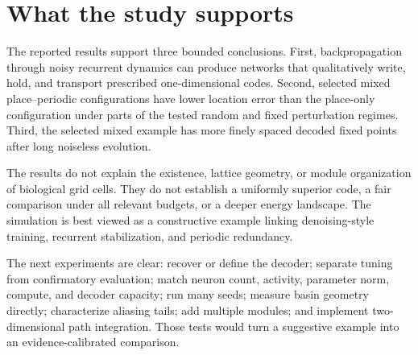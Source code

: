 \section{What the study supports}
\label{sec:attractor-discussion}

The reported results support three bounded conclusions. First, backpropagation through noisy recurrent dynamics can produce networks that qualitatively write, hold, and transport prescribed one-dimensional codes. Second, selected mixed place--periodic configurations have lower location error than the place-only configuration under parts of the tested random and fixed perturbation regimes. Third, the selected mixed example has more finely spaced decoded fixed points after long noiseless evolution.

The results do not explain the existence, lattice geometry, or module organization of biological grid cells. They do not establish a uniformly superior code, a fair comparison under all relevant budgets, or a deeper energy landscape. The simulation is best viewed as a constructive example linking denoising-style training, recurrent stabilization, and periodic redundancy.

The next experiments are clear: recover or define the decoder; separate tuning from confirmatory evaluation; match neuron count, activity, parameter norm, compute, and decoder capacity; run many seeds; measure basin geometry directly; characterize aliasing tails; add multiple modules; and implement two-dimensional path integration. Those tests would turn a suggestive example into an evidence-calibrated comparison.
